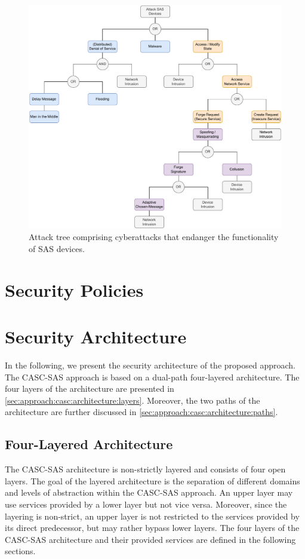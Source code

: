 \begin{figure}
    \centering
    \includegraphics[width=1.0\linewidth]{figures/attack_tree_device.drawio.pdf}
    \caption{Attack tree comprising cyberattacks that endanger the functionality of SAS devices.}
    \label{fig:attack_tree_device}
\end{figure}

\section{Security Policies}
\label{sec:approach:security_policies}

\section{Security Architecture}
\label{sec:approach:casc:architecture}
In the following, we present the security architecture of the proposed approach.
The CASC-SAS approach is based on a dual-path four-layered architecture.
The four layers of the architecture are presented in \autoref{sec:approach:casc:architecture:layers}.
Moreover, the two paths of the architecture are further discussed in \autoref{sec:approach:casc:architecture:paths}.

\subsection{Four-Layered Architecture}
\label{sec:approach:casc:architecture:layers}
The CASC-SAS architecture is non-strictly layered and consists of four open layers.
The goal of the layered architecture is the separation of different domains and levels of abstraction within the CASC-SAS approach.
An upper layer may use services provided by a lower layer but not vice versa.
Moreover, since the layering is non-strict, an upper layer is not restricted to the services provided by its direct predecessor, but may rather bypass lower layers.
The four layers of the CASC-SAS architecture and their provided services are defined in the following sections.

